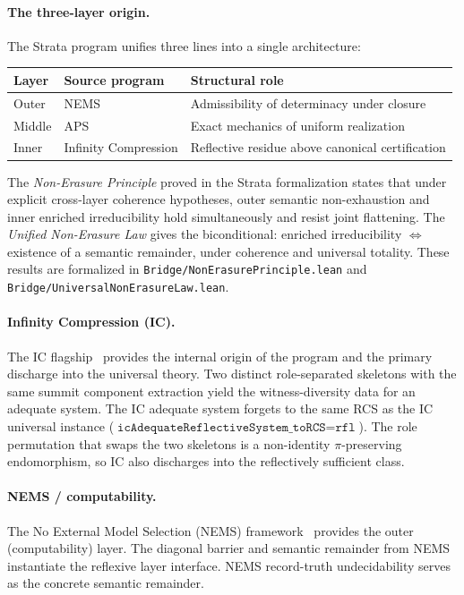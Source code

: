 \documentclass[11pt,a4paper]{article}
\theoremstyle{plain}
\theoremstyle{definition}
\theoremstyle{remark}
\newcommand{\compare}{\pi}
\begin{document}
\paragraph{The three-layer origin.}
The Strata program unifies three lines into a single architecture:

\begin{center}
\begin{tabular}{lll}
\toprule
Layer & Source program & Structural role \\
\midrule
Outer & NEMS & Admissibility of determinacy under closure \\
Middle & APS & Exact mechanics of uniform realization \\
Inner & Infinity Compression & Reflective residue above canonical certification \\
\bottomrule
\end{tabular}
\end{center}

\noindent
The \emph{Non-Erasure Principle} proved in the Strata formalization states
that under explicit cross-layer coherence hypotheses, outer semantic
non-exhaustion and inner enriched irreducibility hold simultaneously and
resist joint flattening. The \emph{Unified Non-Erasure Law} gives the
biconditional: enriched irreducibility $\Leftrightarrow$ existence of a
semantic remainder, under coherence and universal totality. These results
are formalized in \texttt{Bridge/NonErasurePrinciple.lean} and
\texttt{Bridge/UniversalNonErasureLaw.lean}.

\paragraph{Infinity Compression (IC).}
The IC flagship~\cite{Spivack2026-IC-internal,Spivack2026-IC-summit,Spivack2026-IC-synthesis}
provides the internal origin of the program and the primary
discharge into the universal theory. Two distinct role-separated skeletons
with the same summit component extraction yield the witness-diversity data
for an adequate system. The IC adequate system forgets to the same RCS as
the IC universal instance ($\texttt{icAdequateReflectiveSystem\_toRCS} =
\texttt{rfl}$). The role permutation that swaps the two skeletons is a
non-identity $\compare$-preserving endomorphism, so IC also discharges
into the reflectively sufficient class.

\paragraph{NEMS / computability.}
The No External Model Selection (NEMS) framework~\cite{Spivack2026-NEMS01,Spivack2026-NEMS08,Spivack2026-NEMS81}
provides the outer (computability) layer. The diagonal barrier and semantic
remainder from NEMS instantiate the reflexive layer interface. NEMS
record-truth undecidability serves as the concrete semantic remainder.
\end{document}
